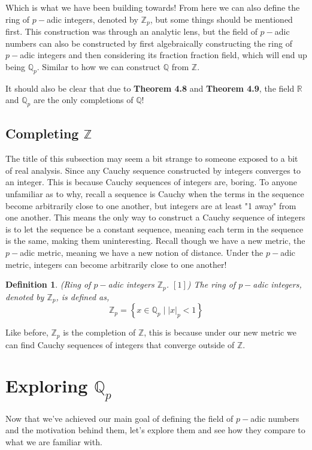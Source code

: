 \documentclass[12pt]{article}
\newtheorem{mydef}[thm]{Definition}
\theoremstyle{definition}
\theoremstyle{remark}
\newcommand{\zz}{\mathbb Z}   %
\newcommand{\qq}{\mathbb Q}   %
\newcommand{\rr}{\mathbb R}   %
\newcommand{\abs}[1]{\left\lvert#1\right\rvert} %
\newcommand{\lrb}[1]{\left[#1\right]}
\newcommand{\lrc}[1]{\left\{#1\right\}}
\begin{document}
    Which is what we have been building towards! From here we can also define the ring of $p-$adic integers, denoted by $\zz_p$, but some things should be mentioned first. This construction was through an analytic lens, but the field of $p-$adic numbers can also be constructed by first algebraically constructing the ring of $p-$adic integers and then considering its fraction fraction field, which will end up being $\qq_p$. Similar to how we can construct $\qq$ from $\zz$. 
    
    It should also be clear that due to \textbf{Theorem 4.8} and \textbf{Theorem 4.9}, the field $\rr$ and $\qq_p$ are the only completions of $\qq$!

    \subsection{Completing $\zz$}
    The title of this subsection may seem a bit strange to someone exposed to a bit of real analysis. Since any Cauchy sequence constructed by integers converges to an integer. This is because Cauchy sequences of integers are, boring. To anyone unfamiliar as to why, recall a sequence is Cauchy when the terms in the sequence become arbitrarily close to one another, but integers are at least "1 away" from one another. This means the only way to construct a Cauchy sequence of integers is to let the sequence be a constant sequence, meaning each term in the sequence is the same, making them uninteresting. Recall though we have a new metric, the $p-$adic metric, meaning we have a new notion of distance. Under the $p-$adic metric, integers can become arbitrarily close to one another!

    \begin{mydef} (Ring of $p-$adic integers $\zz_p$. $\lrb{1}$) The ring of $p-$adic integers, denoted by $\zz_p$, is defined as,
      \[\zz_p = \lrc{x \in \qq_p \mid \abs{x}_p < 1}\]
    \end{mydef}

    Like before, $\zz_p$ is the completion of $\zz$, this is because under our new metric we can find Cauchy sequences of integers that converge outside of $\zz$. 

\section{Exploring $\qq_p$}
    Now that we've achieved our main goal of defining the field of $p-$adic numbers and the motivation behind them, let's explore them and see how they compare to what we are familiar with. 
\end{document}
